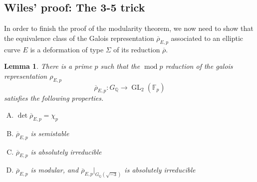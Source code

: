 \documentclass{article}
\theoremstyle{plain}%
\newtheorem{lemma}[theorem]{Lemma}
\theoremstyle{definition}
\theoremstyle{remark}
\newcommand{\GL}{\operatorname{GL}}
\begin{document}
\subsection{Wiles' proof: The 3-5 trick}
In order to finish the proof of the modularity theorem, we now need to show that
the equivalence class of the Galois representation \(\overline{\rho}_{E,p}\) 
associated to an elliptic curve \(E\) is a deformation of type \(\Sigma\) 
of its reduction \(\overline{\rho}\).
\begin{lemma}\label{lem:ADproperties}
    There is a prime \(p\) such that the \(\operatorname{mod} p\) reduction of the galois representation \(\rho_{E,p}\)
    \[
        \overline{\rho}_{E,p} \colon G_\mathbb{Q} \to \GL_2(\mathbb{F}_p)
    \]
    satisfies the following properties.
    \begin{enumerate}[(A)]
        \item \(\det \overline{\rho}_{E,p} = \chi_p\)
        \item \(\overline{\rho}_{E,p}\) is semistable
        \item \(\overline{\rho}_{E,p}\) is absolutely irreducible
        \item \(\overline{\rho}_{E,p}\) is modular, and \(\overline{\rho}_{E,p}|_{G_\mathbb{Q}(\sqrt{-3})}\) is absolutely irreducible
    \end{enumerate}
\end{lemma}
\end{document}
